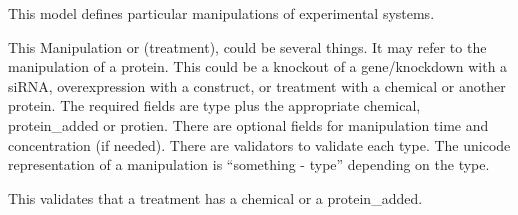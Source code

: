 \documentclass[letterpaper,10pt,english]{sphinxmanual}
\begin{document}
\begin{fulllineitems}
\label{api:experimentdb.hypotheses.models.Manipulation}
This model defines particular manipulations of experimental systems.


This Manipulation or (treatment), could be several things.  It may refer to the manipulation of a protein.  This could be a knockout of a gene/knockdown with a siRNA, overexpression with a construct, or treatment with a chemical or another protein.  The required fields are type plus the appropriate chemical, protein\_added or protien.  There are optional fields for manipulation time and concentration (if needed).  There are validators to validate each type.  The unicode representation of a manipulation is ``something - type'' depending on the type.


\begin{fulllineitems}
\label{api:experimentdb.hypotheses.models.Manipulation.DoesNotExist}
\end{fulllineitems}


\begin{fulllineitems}
\label{api:experimentdb.hypotheses.models.Manipulation.MultipleObjectsReturned}
\end{fulllineitems}


\begin{fulllineitems}
\label{api:experimentdb.hypotheses.models.Manipulation.chemical}
\end{fulllineitems}


\begin{fulllineitems}
\label{api:experimentdb.hypotheses.models.Manipulation.clean}
This validates that a treatment has a chemical or a protein\_added.



\end{fulllineitems}
\end{fulllineitems}
\end{document}
